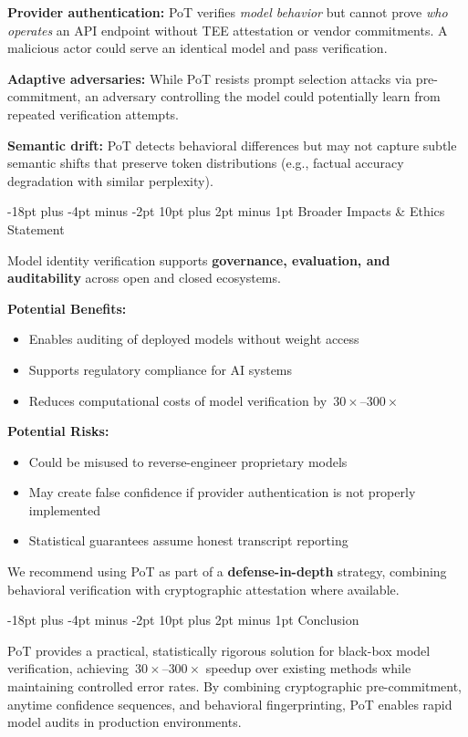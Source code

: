 \documentclass[11pt]{article}
\makeatletter
\renewcommand\section{\@startsection{section}{1}{\z@}%
  {-18pt plus -4pt minus -2pt}%
  {10pt plus 2pt minus 1pt}%
  {\normalfont\Large\bfseries}}
\makeatother
\begin{document}
\textbf{Provider authentication:} PoT verifies \emph{model behavior} but cannot prove \emph{who operates} an API endpoint without TEE attestation or vendor commitments. A malicious actor could serve an identical model and pass verification.

\textbf{Adaptive adversaries:} While PoT resists prompt selection attacks via pre-commitment, an adversary controlling the model could potentially learn from repeated verification attempts.

\textbf{Semantic drift:} PoT detects behavioral differences but may not capture subtle semantic shifts that preserve token distributions (e.g., factual accuracy degradation with similar perplexity).


\section{Broader Impacts \& Ethics Statement}

Model identity verification supports \textbf{governance, evaluation, and auditability} across open and closed ecosystems.

\textbf{Potential Benefits:}
\begin{itemize}
\item Enables auditing of deployed models without weight access
\item Supports regulatory compliance for AI systems
\item Reduces computational costs of model verification by~$30{\times}$--$300{\times}$
\end{itemize}

\textbf{Potential Risks:}
\begin{itemize}
\item Could be misused to reverse-engineer proprietary models
\item May create false confidence if provider authentication is not properly implemented
\item Statistical guarantees assume honest transcript reporting
\end{itemize}

We recommend using PoT as part of a \textbf{defense-in-depth} strategy, combining behavioral verification with cryptographic attestation where available.

\section{Conclusion}

PoT provides a practical, statistically rigorous solution for black-box model verification, achieving~$30{\times}$--$300{\times}$ speedup over existing methods while maintaining controlled error rates. By combining cryptographic pre-commitment, anytime confidence sequences, and behavioral fingerprinting, PoT enables rapid model audits in production environments. 
\end{document}

